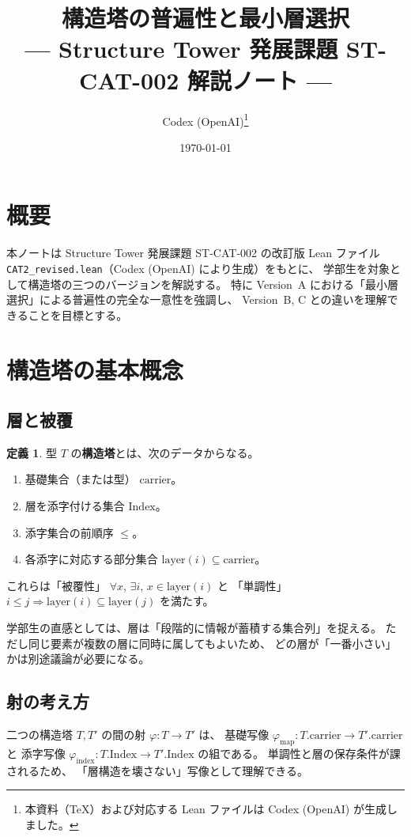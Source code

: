 \documentclass[luatex,a4paper]{ltjsarticle}
\title{構造塔の普遍性と最小層選択\\--- Structure Tower 発展課題 ST-CAT-002 解説ノート ---}
\author{Codex (OpenAI)\thanks{本資料（TeX）および対応する Lean ファイルは Codex (OpenAI) が生成しました。}}
\date{\today}
\theoremstyle{definition}
\newtheorem{definition}{定義}[section]
\theoremstyle{plain}
\theoremstyle{remark}
\begin{document}
\maketitle

\section{概要}
本ノートは Structure Tower 発展課題 ST-CAT-002 の改訂版 Lean ファイル
\texttt{CAT2\_revised.lean}（Codex (OpenAI) により生成）をもとに、
学部生を対象として構造塔の三つのバージョンを解説する。
特に Version~A における「最小層選択」による普遍性の完全な一意性を強調し、
Version~B, C との違いを理解できることを目標とする。

\section{構造塔の基本概念}
\subsection{層と被覆}
\begin{definition}
型 $T$ の\textbf{構造塔}とは、次のデータからなる。
\begin{enumerate}[label=(\arabic*)]
  \item 基礎集合（または型） $\mathrm{carrier}$。
  \item 層を添字付ける集合 $\mathrm{Index}$。
  \item 添字集合の前順序 $\leq$。
  \item 各添字に対応する部分集合 $\mathrm{layer}(i) \subseteq \mathrm{carrier}$。
\end{enumerate}
これらは「被覆性」
$\forall x,\, \exists i,\, x \in \mathrm{layer}(i)$ と
「単調性」
$i \leq j \Rightarrow \mathrm{layer}(i) \subseteq \mathrm{layer}(j)$
を満たす。
\end{definition}

学部生の直感としては、層は「段階的に情報が蓄積する集合列」を捉える。
ただし同じ要素が複数の層に同時に属してもよいため、
どの層が「一番小さい」かは別途議論が必要になる。

\subsection{射の考え方}
二つの構造塔 $T, T'$ の間の射 $\varphi : T \to T'$ は、
基礎写像 $\varphi_{\mathrm{map}} : T.\mathrm{carrier} \to T'.\mathrm{carrier}$ と
添字写像 $\varphi_{\mathrm{index}} : T.\mathrm{Index} \to T'.\mathrm{Index}$ の組である。
単調性と層の保存条件が課されるため、
「層構造を壊さない」写像として理解できる。
\end{document}

